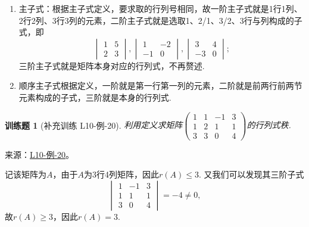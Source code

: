 \documentclass[12pt,fontset=fandol]{ctexart}
\newtheorem{exercise}{训练题}[section]
\begin{document}
\begin{solve}
\begin{enumerate}
        \item 主子式：根据主子式定义，要求取的行列号相同，故一阶主子式就是1行1列、2行2列、3行3列的元素，二阶主子式就是选取1、2/1、3/2、3行与列构成的子式，即
              \[\begin{vmatrix}
                      1 & 5 \\ 2 & 3
                  \end{vmatrix},\begin{vmatrix}
                      1 & -2 \\ -1 & 0
                  \end{vmatrix},\begin{vmatrix}
                      3 & 4 \\ -3 & 0
                  \end{vmatrix};\]
              三阶主子式就是矩阵本身对应的行列式，不再赘述.

        \item 顺序主子式根据定义，一阶就是第一行第一列的元素，二阶就是前两行前两节元素构成的子式，三阶就是本身的行列式.
    \end{enumerate}
\end{solve}

\begin{exercise}[补充训练 L10-例-20]\label{prob:L10-例-20}
利用定义求矩阵$\begin{pmatrix}
            1 & 1 & -1 & 3 \\ 1 & 2 & 1 & 1 \\ 3 & 3 & 0 & 4
        \end{pmatrix}$的行列式秩.
\end{exercise}
\noindent 来源：\href{https://github.com/yhwu-is/Linear-Algebra-Left-Undone/blob/new/%E8%AE%B2%E4%B9%89/%E4%B8%93%E9%A2%98/10%20%E8%A1%8C%E5%88%97%E5%BC%8F.tex}{L10-例-20}。
\begin{solve}
记该矩阵为$A$，由于$A$为3行4列矩阵，因此$r(A)\leqslant 3$. 又我们可以发现其三阶子式
    \[\begin{vmatrix}
            1 & -1 & 3 \\ 1 & 1 & 1 \\ 3 & 0 & 4
        \end{vmatrix}=-4\neq 0,\]
    故$r(A)\geqslant 3$，因此$r(A)=3$.
\end{solve}
\end{document}
